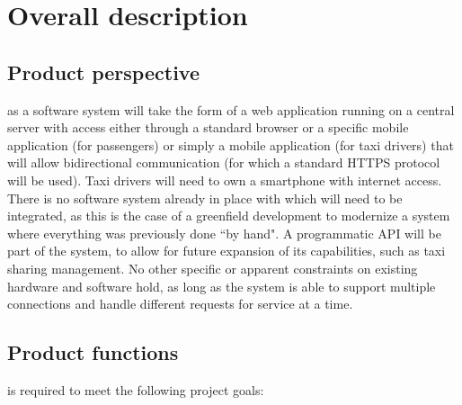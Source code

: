 \chapter{Overall description}

\section{Product perspective}
\mts{} as a software system will take the form of a web application running on a central server with access either through a standard browser or a specific mobile application (for passengers) or simply a mobile application (for taxi drivers) that will allow bidirectional communication (for which a standard HTTPS protocol will be used). Taxi drivers will need to own a smartphone with internet access. There is no software system already in place with which \mts{} will need to be integrated, as this is the case of a greenfield development to modernize a system where everything was previously done ``by hand". A programmatic API will be part of the system, to allow for future expansion of its capabilities, such as taxi sharing management. No other specific or apparent constraints on existing hardware and software hold, as long as the system is able to support multiple connections and handle different requests for service at a time.

\section{Product functions}
\label{sec:goals}
\mts{} is required to meet the following project goals:

